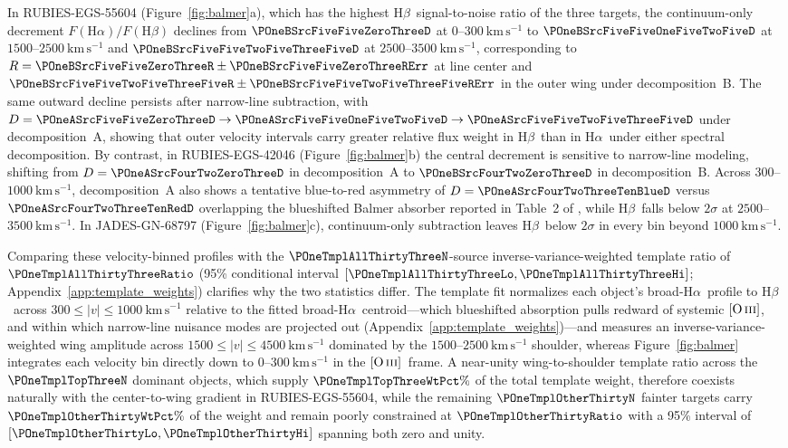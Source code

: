 \documentclass[twocolumn]{aastex631}
\newcommand{\Ha}{\ensuremath{\mathrm{H}\alpha}}
\newcommand{\Hb}{\ensuremath{\mathrm{H}\beta}}
\newcommand{\OIII}{\ensuremath{[\mathrm{O\,\textsc{iii}}]}}
\newcommand{\kms}{\ensuremath{\mathrm{km\,s^{-1}}}}
\begin{document}
In RUBIES-EGS-55604 (Figure~\ref{fig:balmer}a), which has the highest \Hb\ signal-to-noise ratio of the three targets, the continuum-only decrement $F(\Ha)/F(\Hb)$ declines from $\POneBSrcFiveFiveZeroThreeD$ at $0$--$300~\kms$ to $\POneBSrcFiveFiveOneFiveTwoFiveD$ at $1500$--$2500~\kms$ and $\POneBSrcFiveFiveTwoFiveThreeFiveD$ at $2500$--$3500~\kms$, corresponding to $R = \POneBSrcFiveFiveZeroThreeR \pm \POneBSrcFiveFiveZeroThreeRErr$ at line center and $\POneBSrcFiveFiveTwoFiveThreeFiveR \pm \POneBSrcFiveFiveTwoFiveThreeFiveRErr$ in the outer wing under decomposition~B. The same outward decline persists after narrow-line subtraction, with $D = \POneASrcFiveFiveZeroThreeD \to \POneASrcFiveFiveOneFiveTwoFiveD \to \POneASrcFiveFiveTwoFiveThreeFiveD$ under decomposition~A, showing that outer velocity intervals carry greater relative flux weight in \Hb\ than in \Ha\ under either spectral decomposition. By contrast, in RUBIES-EGS-42046 (Figure~\ref{fig:balmer}b) the central decrement is sensitive to narrow-line modeling, shifting from $D = \POneASrcFourTwoZeroThreeD$ in decomposition~A to $\POneBSrcFourTwoZeroThreeD$ in decomposition~B. Across $300$--$1000~\kms$, decomposition~A also shows a tentative blue-to-red asymmetry of $D = \POneASrcFourTwoThreeTenBlueD$ versus $\POneASrcFourTwoThreeTenRedD$ overlapping the blueshifted Balmer absorber reported in Table~2 of \citet{Chen2026}, while \Hb\ falls below $2\sigma$ at $2500$--$3500~\kms$. In JADES-GN-68797 (Figure~\ref{fig:balmer}c), continuum-only subtraction leaves \Hb\ below $2\sigma$ in every bin beyond $1000~\kms$.

Comparing these velocity-binned profiles with the $\POneTmplAllThirtyThreeN$-source inverse-variance-weighted template ratio of $\POneTmplAllThirtyThreeRatio$ (95\% conditional interval $[\POneTmplAllThirtyThreeLo, \POneTmplAllThirtyThreeHi]$; Appendix~\ref{app:template_weights}) clarifies why the two statistics differ. The template fit normalizes each object's broad-\Ha\ profile to \Hb\ across $300 \le |v| \le 1000~\kms$ relative to the fitted broad-\Ha\ centroid---which blueshifted absorption pulls redward of systemic \OIII, and within which narrow-line nuisance modes are projected out (Appendix~\ref{app:template_weights})---and measures an inverse-variance-weighted wing amplitude across $1500 \le |v| \le 4500~\kms$ dominated by the $1500$--$2500~\kms$ shoulder, whereas Figure~\ref{fig:balmer} integrates each velocity bin directly down to $0$--$300~\kms$ in the \OIII\ frame. A near-unity wing-to-shoulder template ratio across the $\POneTmplTopThreeN$ dominant objects, which supply $\POneTmplTopThreeWtPct\%$ of the total template weight, therefore coexists naturally with the center-to-wing gradient in RUBIES-EGS-55604, while the remaining $\POneTmplOtherThirtyN$ fainter targets carry $\POneTmplOtherThirtyWtPct\%$ of the weight and remain poorly constrained at $\POneTmplOtherThirtyRatio$ with a 95\% interval of $[\POneTmplOtherThirtyLo, \POneTmplOtherThirtyHi]$ spanning both zero and unity.
\end{document}
